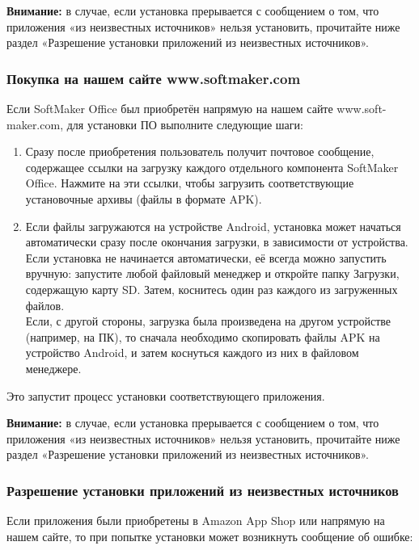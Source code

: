 \documentclass[a4paper,10pt]{article}
\begin{document}
\begin{mdframed}[backgroundcolor=blue!10]
\textbf{Внимание:} в случае, если установка прерывается с сообщением о том, что приложения «из неизвестных источников» нельзя установить, прочитайте ниже раздел «Разрешение установки приложений из неизвестных источников».
\end{mdframed}
\subsubsection{Покупка на нашем сайте www.softmaker.com}
Если SoftMaker Office был приобретён напрямую на нашем сайте www.soft-maker.com, для установки ПО выполните следующие шаги:
\begin{enumerate}
 \item Сразу после приобретения пользователь получит почтовое сообщение, содержащее ссылки на загрузку каждого отдельного компонента SoftMaker Office. Нажмите на эти ссылки, чтобы загрузить соответствующие установочные архивы (файлы в формате APK).
 \item Если файлы загружаются на устройстве Android, установка может начаться автоматически сразу после окончания загрузки, в зависимости от устройства. Если установка не начинается автоматически, её всегда можно запустить вручную: запустите любой файловый менеджер и откройте папку Загрузки, содержащую карту SD. Затем, коснитесь один раз каждого из загруженных файлов.\\
 Если, с другой стороны, загрузка была произведена на другом устройстве (например, на ПК), то сначала необходимо скопировать файлы APK на устройство Android, и затем коснуться каждого из них в файловом менеджере.
\end{enumerate}
Это запустит процесс установки соответствующего приложения.

\begin{mdframed}[backgroundcolor=blue!10]
\textbf{Внимание:} в случае, если установка прерывается с сообщением о том, что приложения «из неизвестных источников» нельзя установить, прочитайте ниже раздел «Разрешение установки приложений из неизвестных источников».
\end{mdframed}

\subsubsection{Разрешение установки приложений из неизвестных источников}
Если приложения были приобретены в Amazon App Shop или напрямую на нашем сайте, то при попытке установки может возникнуть сообщение об ошибке:
\end{document}

